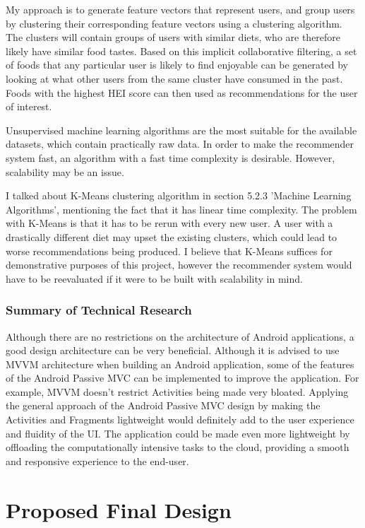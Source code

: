 \documentclass{article}
\begin{document}
\bigskip
\noindent My approach is to generate feature vectors that represent users, and group users by clustering their corresponding feature vectors using a clustering algorithm. The clusters will contain groups of users with similar diets, who are therefore likely have similar food tastes. Based on this implicit collaborative filtering, a set of foods that any particular user is likely to find enjoyable can be generated by looking at what other users from the same cluster have consumed in the past. Foods with the highest HEI score can then used as recommendations for the user of interest.

\bigskip
\noindent Unsupervised machine learning algorithms are the most suitable for the available datasets, which contain practically raw data. In order to make the recommender system fast, an algorithm with a fast time complexity is desirable. 
However, scalability may be an issue. 

\bigskip
\noindent I talked about K-Means clustering algorithm in section 5.2.3 'Machine Learning Algorithms', mentioning the fact that it has linear time complexity. The problem with K-Means is that it has to be rerun with every new user. A user with a drastically different diet may upset the existing clusters, which could lead to worse recommendations being produced. I believe that K-Means suffices for demonstrative purposes of this project, however the recommender system would have to be reevaluated if it were to be built with scalability in mind. 


\subsubsection{Summary of Technical Research}
Although there are no restrictions on the architecture of Android applications, a good design architecture can be very beneficial. Although it is advised to use MVVM architecture when building an Android application, some of the features of the Android Passive MVC \cite{passive_mvc} can be implemented to improve the application. For example, MVVM doesn't restrict Activities being made very bloated. Applying the general approach of the Android Passive MVC design by making the Activities and Fragments lightweight would definitely add to the user experience and fluidity of the UI. The application could be made even more lightweight by offloading the computationally intensive tasks to the cloud, providing a smooth and responsive experience to the end-user. 


\section{Proposed Final Design}
\end{document}
